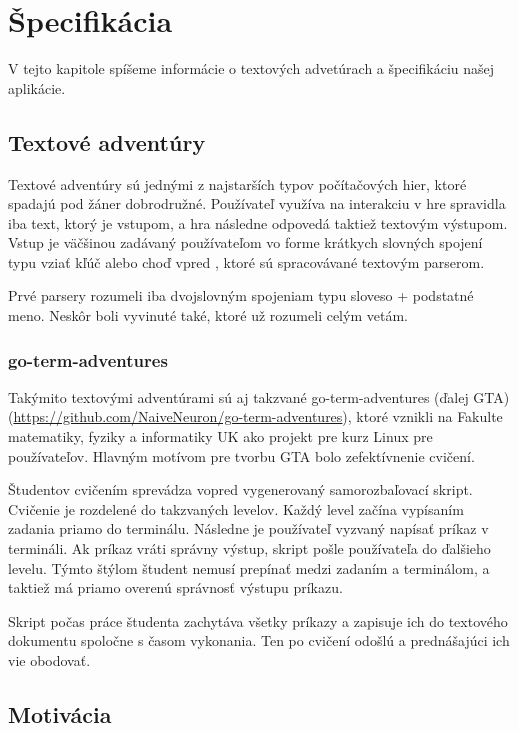 \chapter{Špecifikácia}
\label{kap:specifikacia}

V tejto kapitole spíšeme informácie o textových advetúrach a špecifikáciu
našej aplikácie.

\section{Textové adventúry}
\label{sec:textadventures}

Textové adventúry sú jednými z najstarších typov počítačových hier, ktoré spadajú
pod žáner dobrodružné. Používateľ využíva na interakciu v hre spravidla iba text,
ktorý je vstupom, a hra následne odpovedá taktiež textovým výstupom.
Vstup je väčšinou zadávaný používateľom vo forme krátkych slovných spojení
typu \glqq vziať kľúč \grqq alebo \glqq choď vpred \grqq, ktoré sú spracovávané
textovým parserom.

Prvé parsery rozumeli iba dvojslovným spojeniam typu sloveso + podstatné meno. Neskôr
boli vyvinuté také, ktoré už rozumeli celým vetám.~\cite{bib:adventures}


\subsection{go-term-adventures}
\label{sec:textadventures:gta}

Takýmito textovými adventúrami sú aj takzvané go-term-adventures (ďalej GTA) (\url{https://github.com/NaiveNeuron/go-term-adventures}), ktoré vznikli
na Fakulte matematiky, fyziky a informatiky UK ako projekt pre kurz Linux pre
používateľov. Hlavným motívom pre tvorbu GTA bolo zefektívnenie cvičení.

Študentov cvičením sprevádza vopred vygenerovaný samorozbaľovací skript. Cvičenie
je rozdelené do takzvaných levelov. Každý level začína vypísaním zadania priamo do
terminálu. Následne je používateľ vyzvaný napísať príkaz v termináli. Ak príkaz
vráti správny výstup, skript pošle používateľa do ďalšieho levelu. Týmto štýlom
študent nemusí prepínať medzi zadaním a terminálom, a taktiež má priamo overenú správnosť
výstupu príkazu.

Skript počas práce študenta zachytáva všetky príkazy a zapisuje ich do textového
dokumentu spoločne s časom vykonania. Ten po cvičení odošlú a prednášajúci ich vie
obodovať.

\section{Motivácia}
\label{sec:motivacia}


